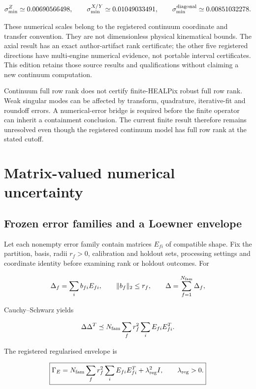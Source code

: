 \documentclass[
  11pt,
  a4paper]{article}
\begin{document}
\[
\sigma_{\min}^{Z}\simeq0.00690566498,
\qquad
\sigma_{\min}^{X/Y}\simeq0.01049033491,
\qquad
\sigma_{\min}^{\rm diagonal}\simeq0.00851032278.
\]

These numerical scales belong to the registered continuum coordinate and transfer convention. They are not dimensionless physical kinematical bounds. The axial result has an exact author-artifact rank certificate; the other five registered directions have multi-engine numerical evidence, not portable interval certificates. This edition retains those source results and qualifications without claiming a new continuum computation.

Continuum full row rank does not certify finite-HEALPix robust full row rank. Weak singular modes can be affected by transform, quadrature, iterative-fit and roundoff errors. A numerical-error bridge is required before the finite operator can inherit a containment conclusion. The current finite result therefore remains unresolved even though the registered continuum model has full row rank at the stated cutoff.

\hypertarget{matrix-valued-numerical-uncertainty}{%
\section{Matrix-valued numerical uncertainty}\label{matrix-valued-numerical-uncertainty}}

\hypertarget{frozen-error-families-and-a-loewner-envelope}{%
\subsection{Frozen error families and a Loewner envelope}\label{frozen-error-families-and-a-loewner-envelope}}

Let each nonempty error family contain matrices \(E_{fi}\) of compatible shape. Fix the partition, basis, radii \(r_f>0\), calibration and holdout sets, processing settings and coordinate identity before examining rank or holdout outcomes. For

\[
\Delta_f=\sum_i b_{fi}E_{fi},\qquad \|b_f\|_2\le r_f,
\qquad
\Delta=\sum_{f=1}^{N_{\rm fam}}\Delta_f,
\]

Cauchy--Schwarz yields

\[
\Delta\Delta^T
\preceq N_{\rm fam}\sum_f r_f^2\sum_iE_{fi}E_{fi}^T.
\]

The registered regularised envelope is

\[
\boxed{
\Gamma_E=N_{\rm fam}\sum_f r_f^2\sum_iE_{fi}E_{fi}^T
+\lambda_{\rm reg}^2I,
\qquad\lambda_{\rm reg}>0.
}
\]
\end{document}

